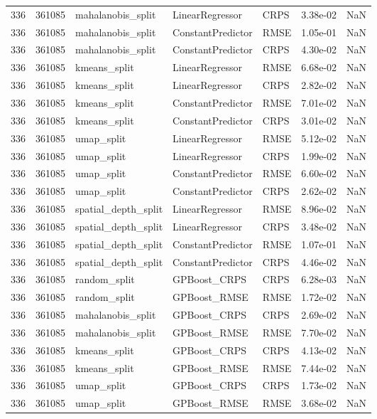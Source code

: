 \begin{tabular}{rrlllrr}
336 & 361085 & mahalanobis\_split & LinearRegressor & CRPS & 3.38e-02 & NaN \\
336 & 361085 & mahalanobis\_split & ConstantPredictor & RMSE & 1.05e-01 & NaN \\
336 & 361085 & mahalanobis\_split & ConstantPredictor & CRPS & 4.30e-02 & NaN \\
336 & 361085 & kmeans\_split & LinearRegressor & RMSE & 6.68e-02 & NaN \\
336 & 361085 & kmeans\_split & LinearRegressor & CRPS & 2.82e-02 & NaN \\
336 & 361085 & kmeans\_split & ConstantPredictor & RMSE & 7.01e-02 & NaN \\
336 & 361085 & kmeans\_split & ConstantPredictor & CRPS & 3.01e-02 & NaN \\
336 & 361085 & umap\_split & LinearRegressor & RMSE & 5.12e-02 & NaN \\
336 & 361085 & umap\_split & LinearRegressor & CRPS & 1.99e-02 & NaN \\
336 & 361085 & umap\_split & ConstantPredictor & RMSE & 6.60e-02 & NaN \\
336 & 361085 & umap\_split & ConstantPredictor & CRPS & 2.62e-02 & NaN \\
336 & 361085 & spatial\_depth\_split & LinearRegressor & RMSE & 8.96e-02 & NaN \\
336 & 361085 & spatial\_depth\_split & LinearRegressor & CRPS & 3.48e-02 & NaN \\
336 & 361085 & spatial\_depth\_split & ConstantPredictor & RMSE & 1.07e-01 & NaN \\
336 & 361085 & spatial\_depth\_split & ConstantPredictor & CRPS & 4.46e-02 & NaN \\
336 & 361085 & random\_split & GPBoost\_CRPS & CRPS & 6.28e-03 & NaN \\
336 & 361085 & random\_split & GPBoost\_RMSE & RMSE & 1.72e-02 & NaN \\
336 & 361085 & mahalanobis\_split & GPBoost\_CRPS & CRPS & 2.69e-02 & NaN \\
336 & 361085 & mahalanobis\_split & GPBoost\_RMSE & RMSE & 7.70e-02 & NaN \\
336 & 361085 & kmeans\_split & GPBoost\_CRPS & CRPS & 4.13e-02 & NaN \\
336 & 361085 & kmeans\_split & GPBoost\_RMSE & RMSE & 7.44e-02 & NaN \\
336 & 361085 & umap\_split & GPBoost\_CRPS & CRPS & 1.73e-02 & NaN \\
336 & 361085 & umap\_split & GPBoost\_RMSE & RMSE & 3.68e-02 & NaN \\

\end{tabular}
